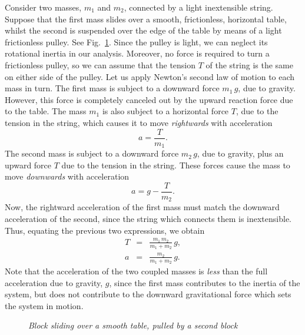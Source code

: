Consider two masses, $m_1$ and $m_2$, connected by a light
inextensible string. Suppose that the first mass slides
over a smooth, frictionless, horizontal table, whilst the
second is suspended over the edge of the table by means
of a light frictionless pulley. See Fig.~\ref{f30}. Since the
pulley is light, we can neglect its rotational inertia in our analysis.
Moreover,  no force is required to turn a frictionless pulley, so we can
assume that the  tension
$T$ of the string is the same on either side of the pulley. Let us
apply Newton's second law of motion to each mass in turn. The first mass
is subject to a downward force $m_1\,g$, due to gravity. However, this force
is completely canceled out by the upward reaction force due to the table.
The mass $m_1$ is also subject to a horizontal force $T$, due to
the tension in the string, which causes it to move {\em rightwards}
with acceleration
\begin{equation}
a = \frac{T}{m_1}.
\end{equation}
The second mass is subject to a downward force $m_2\,g$, due to gravity,
plus an upward force $T$ due to the tension in the string. These forces
cause the mass to move {\em downwards} with acceleration
\begin{equation}
a =g - \frac{T}{m_2}.
\end{equation}
Now, the rightward acceleration of the first mass must match the downward
acceleration of the second, since the string which connects them is
inextensible. Thus, equating the previous two expressions, we obtain
\begin{eqnarray}
T&=& \frac{m_1\,m_2}{m_1+m_2}\,g,\\[0.5ex]
a &=& \frac{m_2}{m_1+m_2}\,g.
\end{eqnarray}
Note that the acceleration of the two coupled masses is {\em less}
than the full acceleration due to gravity, $g$, since the first mass
contributes to the inertia of the system, but does not contribute
to the downward gravitational force which sets the system in motion.

\begin{figure}
\epsfysize=2in
\centerline{}
\caption{\em Block sliding over a smooth table, pulled by a
second block}\label{f30}   
\end{figure}

